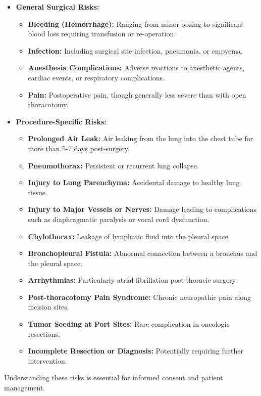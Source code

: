 \begin{itemize}
  \item \textbf{General Surgical Risks:}
    \begin{itemize}
      \item \textbf{Bleeding (Hemorrhage):} Ranging from minor oozing to significant blood loss requiring transfusion or re-operation.
      \item \textbf{Infection:} Including surgical site infection, pneumonia, or empyema.
      \item \textbf{Anesthesia Complications:} Adverse reactions to anesthetic agents, cardiac events, or respiratory complications.
      \item \textbf{Pain:} Postoperative pain, though generally less severe than with open thoracotomy.
    \end{itemize}
  \item \textbf{Procedure-Specific Risks:}
    \begin{itemize}
      \item \textbf{Prolonged Air Leak:} Air leaking from the lung into the chest tube for more than 5-7 days post-surgery.
      \item \textbf{Pneumothorax:} Persistent or recurrent lung collapse.
      \item \textbf{Injury to Lung Parenchyma:} Accidental damage to healthy lung tissue.
      \item \textbf{Injury to Major Vessels or Nerves:} Damage leading to complications such as diaphragmatic paralysis or vocal cord dysfunction.
      \item \textbf{Chylothorax:} Leakage of lymphatic fluid into the pleural space.
      \item \textbf{Bronchopleural Fistula:} Abnormal connection between a bronchus and the pleural space.
      \item \textbf{Arrhythmias:} Particularly atrial fibrillation post-thoracic surgery.
      \item \textbf{Post-thoracotomy Pain Syndrome:} Chronic neuropathic pain along incision sites.
      \item \textbf{Tumor Seeding at Port Sites:} Rare complication in oncologic resections.
      \item \textbf{Incomplete Resection or Diagnosis:} Potentially requiring further intervention.
    \end{itemize}
\end{itemize}

Understanding these risks is essential for informed consent and patient management.

